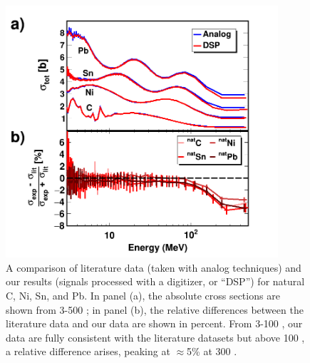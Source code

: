 \begin{figure}[tb]
    \centering
    \includegraphics[width=0.9\textwidth]{figures/literatureBenchmarking.png}
    \caption[Comparison of our natural-sample \tot\ measurement against literature data]
    {
        A comparison of literature data (taken with analog
        techniques) and our results (signals processed with a digitizer, or
        ``DSP'')
        for natural C, Ni, Sn, and Pb. In panel (a), the absolute cross sections are shown from
        3-500 \mega\electronvolt; in panel (b), the relative differences between the literature data and
        our data are shown in percent. From 3-100 \mega\electronvolt, our data are fully consistent with the
        literature datasets but above 100 \mega\electronvolt, a relative difference arises, peaking at
        $\approx$5\% at 300 \mega\electronvolt.
    }
    \label{LiteratureBenchmarking}
\end{figure}

